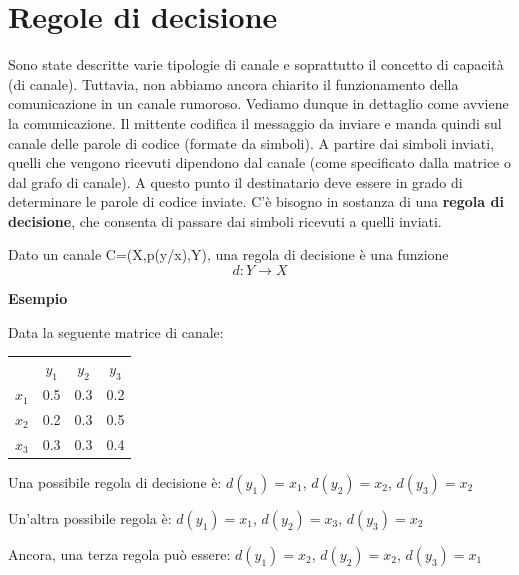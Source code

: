 \section{Regole di decisione}
Sono state descritte varie tipologie di canale e soprattutto il concetto di capacità (di canale). Tuttavia, non abbiamo ancora chiarito 
il funzionamento della comunicazione in un canale rumoroso. Vediamo dunque in dettaglio come avviene la comunicazione.
Il mittente codifica il messaggio da inviare e manda quindi sul canale delle parole di codice (formate da simboli).
A partire dai simboli inviati, quelli che vengono ricevuti dipendono dal canale (come specificato dalla matrice o dal grafo di canale).
A questo punto il destinatario deve essere in grado di determinare le parole di codice inviate.
C'è bisogno in sostanza di una \textbf{regola di decisione}, che consenta di passare dai simboli ricevuti a quelli inviati.

\begin{definizione}
 Dato un canale C=(X,p(y/x),Y), una regola di decisione è una funzione
 \[
  d: Y \to X
 \]
\end{definizione}

\noindent
\textbf{Esempio}

\noindent
Data la seguente matrice di canale:

\begin{table}[htbp]
  \begin{center}
   \begin{tabular}{c c c c}
	& $y_1$ & $y_2$ & $y_3$ \\
	$x_1$ & 0.5 & 0.3 & 0.2 \\ 
	$x_2$ & 0.2 & 0.3 & 0.5  \\ 
	$x_3$ & 0.3 & 0.3 & 0.4  \\ 
    \end{tabular}
  \end{center}
\end{table}

\noindent
Una possibile regola di decisione è:
$d(y_1)=x_1$, 
$d(y_2)=x_2$, 
$d(y_3)=x_2$

\noindent
Un'altra possibile regola è:
$d(y_1)=x_1$, 
$d(y_2)=x_3$, 
$d(y_3)=x_2$

\noindent
Ancora, una terza regola può essere:
$d(y_1)=x_2$, 
$d(y_2)=x_2$, 
$d(y_3)=x_1$

\bigskip

